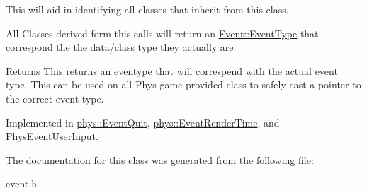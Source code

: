 This will aid in identifying all classes that inherit from this class. 

All Classes derived form this calls will return an \hyperlink{classphys_1_1Event_af5fdbb3e08d8e578d58770fbc606fda7}{Event::EventType} that correspond the the data/class type they actually are. \begin{DoxyReturn}{Returns}
This returns an eventype that will correspend with the actual event type. This can be used on all Phys game provided class to safely cast a pointer to the correct event type. 
\end{DoxyReturn}


Implemented in \hyperlink{classphys_1_1EventQuit_a4df44098d0ef838db55a8e2a016d0724}{phys::EventQuit}, \hyperlink{classphys_1_1EventRenderTime_a66918bf3793196899621e4442a6f7a57}{phys::EventRenderTime}, and \hyperlink{classPhysEventUserInput_a2a39643cd222f7af0db7b087e0441582}{PhysEventUserInput}.



The documentation for this class was generated from the following file:\begin{DoxyCompactItemize}
\item 
event.h\end{DoxyCompactItemize}
